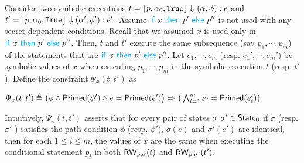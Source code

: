 Consider two symbolic executions
$t=\lceil{p, \alpha_0,{\tt True}}\rfloor\Downarrow
(\alpha,\phi):e$ and $t'=\lceil{p, \alpha_0,{\tt True}}\rfloor\Downarrow
(\alpha',\phi'):e'$. Assume ${\Pif} \ x \ {\Pthen} \  p' \ {\Pelse} \ p''$ is not used with any secret-dependent conditions.
Recall that we assumed  $x$ is used only in ${\Pif} \ x \ {\Pthen} \  p' \ {\Pelse} \ p''$.
Then, $t$ and $t'$ execute the same subsequence (say $p_1,\cdots,p_m$) of the statements that are ${\Pif} \ x \ {\Pthen} \  p' \ {\Pelse} \ p''$.
Let $e_1,\cdots,e_m$ (resp. $e_1',\cdots,e_m'$) be symbolic values of $x$
when executing $p_1,\cdots,p_m$ in the symbolic execution $t$ (resp. $t'$).
Define the constraint $\Psi_x(t,t')$ as
\begin{center}
 $\Psi_x(t,t') \triangleq\big(\phi\wedge {\sf Primed}(\phi')\wedge e={\sf Primed}(e')\big)\Rightarrow \big(\bigwedge_{i=1}^m e_i={\sf Primed}(e_i')\big)$
\end{center}

%
%
Intuitively, $\Psi_x(t,t')$ asserts that for every pair of
states $\sigma,\sigma'\in {\sf State}_0$
if  $\sigma$ (resp. $\sigma'$ ) satisfies the path condition $\phi$ (resp. $\phi'$), $\sigma(e)$
and $\sigma'(e')$ are identical, then for each $1\leq i\leq m$,  
the values of $x$ are the same when executing the conditional statement $p_i$ in both ${\sf RW}_{\varrho,\sigma}(t)$ and ${\sf RW}_{\varrho,\sigma'}(t')$.



